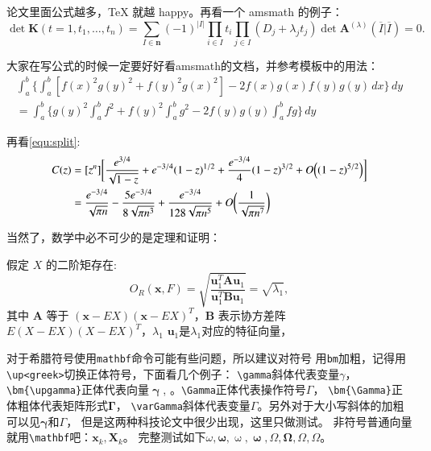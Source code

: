 论文里面公式越多，\TeX{} 就越 happy。再看一个 \textsf{amsmath} 的例子：
\newcommand{\envert}[1]{\left\lvert#1\right\rvert}
\begin{equation}\label{detK2}
  \det\mathbf{K}(t=1,t_1,\dots,t_n)=\sum_{I\in\mathbf{n}}(-1)^{\envert{I}}
  \prod_{i\in I}t_i\prod_{j\in I}(D_j+\lambda_jt_j)\det\mathbf{A}
  ^{(\lambda)}(\overline{I}|\overline{I})=0.
\end{equation}

大家在写公式的时候一定要好好看\textsf{amsmath}的文档，并参考模板中的用法：
\begin{multline*}%
  \int_a^b\biggl\{\int_a^b[f(x)^2g(y)^2+f(y)^2g(x)^2]
  -2f(x)g(x)f(y)g(y)\,dx\biggr\}\,dy \\
  =\int_a^b\biggl\{g(y)^2\int_a^bf^2+f(y)^2
  \int_a^b g^2-2f(y)g(y)\int_a^b fg\biggr\}\,dy
\end{multline*}

再看\ref{equ:split}:
\begin{equation}\label{equ:split}
  \begin{split}
    C(z) &= [z^n] \biggl[\frac{e^{3/4}}{\sqrt{1-z}} +
      e^{-3/4}(1-z)^{1/2} + \frac{e^{-3/4}}{4}(1-z)^{3/2}
      + O\Bigl( (1-z)^{5/2}\Bigr)\biggr] \\
    &= \frac{e^{-3/4}}{\sqrt{\pi n}} - \frac{5e^{-3/4}}{8\sqrt{\pi
        n^3}} + \frac{e^{-3/4}}{128 \sqrt{\pi n^5}} +
    O\biggl(\frac{1}{\sqrt{\pi
        n^7}}\biggr)
  \end{split}
\end{equation}

当然了，数学中必不可少的是定理和证明：
\begin{theorem}
  \label{chapTSthm:rayleigh solution}
  假定 $X$ 的二阶矩存在:
  \begin{equation}
    O_R(\mathbf{x},F)=\sqrt{\frac{\mathbf{u}_1^T\mathbf{A}\mathbf{u}_1} {\mathbf{u}_1^T\mathbf{B}\mathbf{u}_1}}=\sqrt{\lambda_1},
  \end{equation}
  其中 $\mathbf{A}$ 等于 $(\mathbf{x}-EX)(\mathbf{x}-EX)^T$，$\mathbf{B}$ 表示协方差阵 $E(X-EX)(X-EX)^T$，$\lambda_1$
  $\mathbf{u}_1$是$\lambda_1$对应的特征向量，
\end{theorem}

对于希腊符号使用\verb|mathbf|命令可能有些问题，所以建议对符号
用\verb|bm|加粗，记得用\verb|\up<greek>|切换正体符号，下面看几个例子：
\verb|\gamma|斜体代表变量$\gamma$，\verb|\bm{\upgamma}|正体代表向量$\bm{\upgamma}$,
。\verb|\Gamma|正体代表操作符号$\Gamma$，
\verb|\bm{\Gamma}|正体粗体代表矩阵形式$\bm{\Gamma}$，
\verb|\varGamma|斜体代表变量$\varGamma$。另外对于大小写斜体的加粗可以见$\bm{\gamma}$和$\bm{\varGamma}$，
但是这两种科技论文中很少出现，这里只做测试。
非符号普通向量就用\verb|\mathbf|吧：$\mathbf{x}_k,\mathbf{X}_k$。
完整测试如下$\omega,\bm{\omega},\upomega,\bm{\upomega},\Omega,\bm{\Omega},\varOmega,\bm{\varOmega}$。

